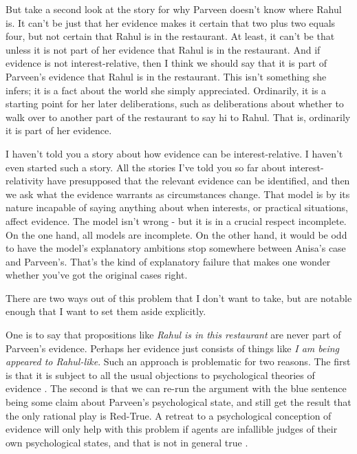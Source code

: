 \documentclass[11pt,]{book}
\begin{document}
But take a second look at the story for why Parveen doesn't know where Rahul is. It can't be just that her evidence makes it certain that two plus two equals four, but not certain that Rahul is in the restaurant. At least, it can't be that unless it is not part of her evidence that Rahul is in the restaurant. And if evidence is not interest-relative, then I think we should say that it is part of Parveen's evidence that Rahul is in the restaurant. This isn't something she infers; it is a fact about the world she simply appreciated. Ordinarily, it is a starting point for her later deliberations, such as deliberations about whether to walk over to another part of the restaurant to say hi to Rahul. That is, ordinarily it is part of her evidence.

I haven't told you a story about how evidence can be interest-relative. I haven't even started such a story. All the stories I've told you so far about interest-relativity have presupposed that the relevant evidence can be identified, and then we ask what the evidence warrants as circumstances change. That model is by its nature incapable of saying anything about when interests, or practical situations, affect evidence. The model isn't wrong - but it is in a crucial respect incomplete. On the one hand, all models are incomplete. On the other hand, it would be odd to have the model's explanatory ambitions stop somewhere between Anisa's case and Parveen's. That's the kind of explanatory failure that makes one wonder whether you've got the original cases right.

There are two ways out of this problem that I don't want to take, but are notable enough that I want to set them aside explicitly.

One is to say that propositions like \emph{Rahul is in this restaurant} are never part of Parveen's evidence. Perhaps her evidence just consists of things like \emph{I am being appeared to Rahul-like}. Such an approach is problematic for two reasons. The first is that it is subject to all the usual objections to psychological theories of evidence \citep{Williamson2007}. The second is that we can re-run the argument with the blue sentence being some claim about Parveen's psychological state, and still get the result that the only rational play is Red-True. A retreat to a psychological conception of evidence will only help with this problem if agents are infallible judges of their own psychological states, and that is not in general true \citep{Schwitzgebel2008}.
\end{document}
